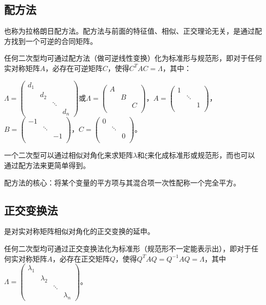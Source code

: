 \documentclass[UTF8, 12pt]{ctexart}
\begin{document}
\subsection{配方法}

也称为拉格朗日配方法。配方法与前面的特征值、相似、正交理论无关，是通过配方找到一个可逆的合同矩阵。

任何二次型均可通过配方法（做可逆线性变换）化为标准形与规范形，即对于任何实对称矩阵$A$，必存在可逆矩阵$C$，使得$C^TAC=\Lambda$，其中：

$\Lambda=\left(\begin{array}{cccc}
d_1 \\
& d_2 \\
& & \ddots \\
& & & d_n
\end{array}\right)$或$\Lambda=\left(\begin{array}{ccccccccc}
A \\
& B \\
& & C \\
\end{array}\right)$，$A=\left(\begin{array}{ccc}
1 \\
& \ddots \\
& & 1 \\
\end{array}\right)$，$B=\left(\begin{array}{ccc}
-1 \\
& \ddots \\
& & -1 \\
\end{array}\right)$，$C=\left(\begin{array}{ccc}
0 \\
& \ddots \\
& & 0 \\
\end{array}\right)$。\medskip

一个二次型可以通过相似对角化来求矩阵$\lambda$和$\xi$来化成标准形或规范形，而也可以通过配方法来更简单得到。

配方法的核心：将某个变量的平方项与其混合项一次性配称一个完全平方。

\subsection{正交变换法}

是对实对称矩阵相似对角化的正交变换的延申。

任何二次型均可通过正交变换法化为标准形（规范形不一定能表示出），即对于任何实对称矩阵$A$，必存在正交矩阵$Q$，使得$Q^TAQ=Q^{-1}AQ=\Lambda$，其中$\Lambda=\left(\begin{array}{cccc}
\lambda_1 \\
& \lambda_2 \\
& & \ddots \\
& & & \lambda_n
\end{array}\right)$。
\end{document}
